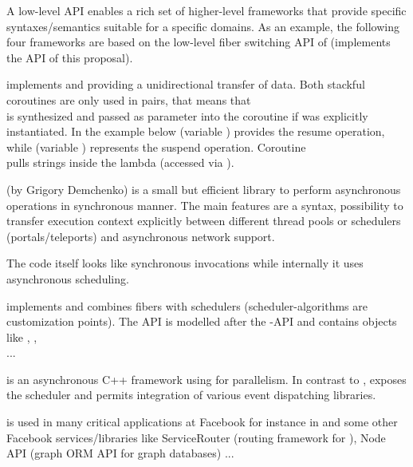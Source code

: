 
A low-level API enables a rich set of higher-level frameworks that provide
specific syntaxes/semantics suitable for a specific domains. As an example, the
following four frameworks are based on the low-level fiber switching API of
\bcontext\cite{bcontext} (implements the API of this proposal).

\uabschnitt{\bcoroutine}\cite{bcoroutine2} implements 
 and  providing a
unidirectional transfer of data. Both stackful coroutines are only used in
pairs, that means that\\
 is synthesized and passed as parameter into the
coroutine if  was explicitly instantiated. In the
example below  (variable ) provides the
resume operation, while  (variable )
represents the suspend operation. Coroutine\\
 pulls strings inside the lambda (accessed via
).

\uabschnitt{\synca}\cite{synca} (by Grigory Demchenko) is a small but efficient
library to perform asynchronous operations in synchronous manner. The main
features are a  syntax, possibility to transfer execution context
explicitly between different thread pools or schedulers (portals/teleports) and
asynchronous network support.

The code itself looks like synchronous invocations while internally it uses
asynchronous scheduling.

\uabschnitt{\bfiber}\cite{bfiber} implements  and combines
fibers with schedulers (scheduler-algorithms are customization points). The API
is modelled after the -API and contains objects like
, ,\\
 ...

\cite{fbfiber} is an asynchronous C++ framework
using  for parallelism. In contrast to \bfiber,
\fbfibers\xspace exposes the scheduler and permits integration of various
event dispatching libraries.

\fbfibers\xspace is used in many critical applications at Facebook for instance
in \fbmcrouter\cite{fbmcrouter} and some other Facebook services/libraries like
ServiceRouter (routing framework for \fbthrift\cite{fbthrift}), Node API (graph
ORM API for graph databases) ...\\

